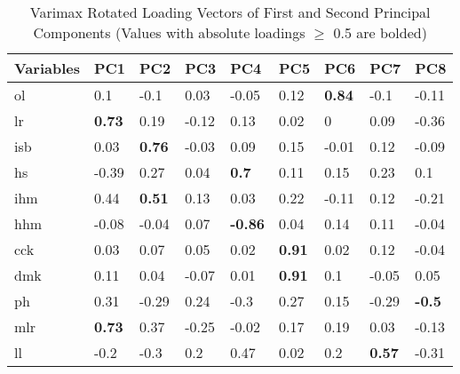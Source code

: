\begin{table*}[!th]
\centering
\footnotesize
\caption{Varimax Rotated Loading Vectors of First and Second Principal Components (Values with absolute loadings $\geq$ 0.5 are bolded)}
\label{pca}
\begin{tabular}{|l|l|l|l|l|l|l|l|l|}
\hline
\textbf{Variables} & \textbf{PC1}  & \textbf{PC2}   & \textbf{PC3}   & \textbf{PC4}   & \textbf{PC5}  & \textbf{PC6}   & \textbf{PC7}   & \textbf{PC8}   \\ \hline
ol        & 0.1           & -0.1          & 0.03           & -0.05          & 0.12          & \textbf{0.84} & -0.1          & -0.11         \\ \hline
lr        & \textbf{0.73} & 0.19          & -0.12          & 0.13           & 0.02          & 0             & 0.09          & -0.36         \\ \hline
isb       & 0.03          & \textbf{0.76} & -0.03          & 0.09           & 0.15          & -0.01         & 0.12          & -0.09         \\ \hline
hs        & -0.39         & 0.27          & 0.04           & \textbf{0.7}   & 0.11          & 0.15          & 0.23          & 0.1           \\ \hline
ihm       & 0.44          & \textbf{0.51} & 0.13           & 0.03           & 0.22          & -0.11         & 0.12          & -0.21         \\ \hline
hhm       & -0.08         & -0.04         & 0.07           & \textbf{-0.86} & 0.04          & 0.14          & 0.11          & -0.04         \\ \hline
cck       & 0.03          & 0.07          & 0.05           & 0.02           & \textbf{0.91} & 0.02          & 0.12          & -0.04         \\ \hline
dmk       & 0.11          & 0.04          & -0.07          & 0.01           & \textbf{0.91} & 0.1           & -0.05         & 0.05          \\ \hline
ph        & 0.31          & -0.29         & 0.24           & -0.3           & 0.27          & 0.15          & -0.29         & \textbf{-0.5} \\ \hline
mlr       & \textbf{0.73} & 0.37          & -0.25          & -0.02          & 0.17          & 0.19          & 0.03          & -0.13         \\ \hline
ll        & -0.2          & -0.3          & 0.2            & 0.47           & 0.02          & 0.2           & \textbf{0.57} & -0.31         \\ \hline

\end{tabular}
\end{table*}
